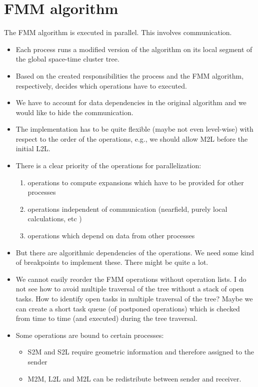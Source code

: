 \documentclass[a4paper,11pt]{article}
\theoremstyle{plain}
\theoremstyle{definition}
\theoremstyle{remark}
\begin{document}
  
\section{FMM algorithm}
The FMM algorithm is executed in parallel. This involves communication.
\begin{itemize}
  \item Each process runs a modified version of the algorithm on its local segment
    of the global space-time cluster tree.
  \item Based on the created responsibilities the process and the FMM
    algorithm, respectively, decides which operations have to executed.   
\item We have to account for data dependencies in the original algorithm and we
  would like to hide the communication.
\item The implementation has to be quite flexible (maybe not even level-wise)
  with respect to the order of the operations, e.g., we should allow M2L before
  the initial L2L.
\item There is a clear priority of the operations for parallelization:
  \begin{enumerate}
  \item operations to compute expansions which have to be provided for other processes
  \item operations independent of communication (nearfield, purely local
    calculations, etc )
  \item operations which depend on data from other processes
  \end{enumerate}
\item But there are algorithmic dependencies of the operations. We need
  some kind of breakpoints to implement these. There might be quite a lot.
\item We cannot easily reorder the FMM operations without operation lists.
  I do not see how to avoid multiple traversal of the tree without a stack
  of open tasks. How to identify open tasks in multiple traversal of the tree?
    Maybe we can create a short task queue (of postponed operations) which
    is checked from time to time (and executed) during the tree traversal.
\item Some operations are bound to certain processes:
  \begin{itemize}
  \item S2M and S2L require geometric information and therefore assigned to the
    sender 
  \item M2M, L2L and M2L can be redistribute between sender and receiver.

\end{itemize}
\end{itemize}
\end{document}
